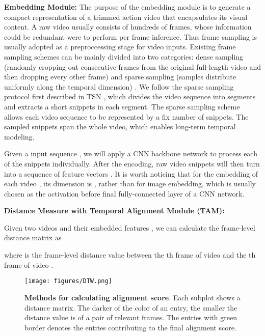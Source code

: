 \documentclass[10pt,twocolumn,letterpaper]{article}
\begin{document}
\noindent
\textbf{Embedding Module:} The purpose of the embedding module  is to generate a compact representation of a trimmed action video that encapsulates its visual content. A raw video usually consists of hundreds of frames, whose information could be redundant were to perform per frame inference. Thus frame sampling is usually adopted as a preproccessing stage for video inputs. Existing frame sampling schemes can be mainly divided into two categories: dense sampling (randomly cropping out
 consecutive frames from the original full-length video and
then dropping every other frame) \cite{tran2015learning, carreira2017quo, wang2018non, xie2018rethinking} and sparse sampling (samples distribute uniformly along the temporal dimension) \cite{wang2016temporal, zolfaghari2018eco, zhou2018temporal, lin2018temporal}. We follow the sparse sampling protocol first described in TSN \cite{wang2016temporal}, which divides the video sequence into  segments and extracts a short snippets in each segment. The sparse sampling scheme allows each video sequence to be represented by a fix number of snippets. The sampled snippets span the whole video, which enables long-term temporal modeling.

Given a input sequence , we will apply a CNN backbone network  to process each of the snippets individually. After the encoding, raw video snippets will then turn into a sequence of feature vectors . It is worth noticing that for the embedding of each video , its dimension is , rather than  for image embedding, which is usually chosen as the activation before final fully-connected layer of a CNN network.



\noindent
\textbf{Distance Measure with Temporal Alignment Module (TAM):} 

Given two videos  and their embedded features , we can calculate the frame-level distance matrix  as 

where  is the frame-level distance value between the th frame of video  and the th frame of video . 
\begin{figure*}[h]
    \centering
    \texttt{[image: figures/DTW.png]}
    \caption{\textbf{Methods for calculating alignment score}. Each subplot shows a distance matrix. The darker of the color of an entry, the smaller the distance value is of a pair of relevant frames. The entries with green border denotes the entries contributing to the final alignment score.}
    \label{fig:DTW}
\end{figure*}
\end{document}
